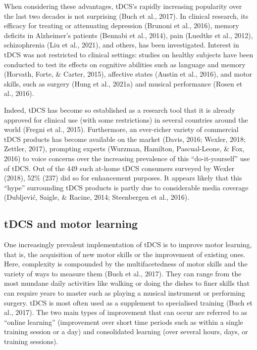 \documentclass[
  man,floatsintext]{apa6}
\begin{document}
When considering these advantages, tDCS's rapidly increasing popularity over the last two decades is not surprising (Buch et al., 2017). In clinical research, its efficacy for treating or attenuating depression (Brunoni et al., 2016), memory deficits in Alzheimer's patients (Bennabi et al., 2014), pain (Luedtke et al., 2012), schizophrenia (Liu et al., 2021), and others, has been investigated. Interest in tDCS was not restricted to clinical settings: studies on healthy subjects have been conducted to test its effects on cognitive abilities such as language and memory (Horvath, Forte, \& Carter, 2015), affective states (Austin et al., 2016), and motor skills, such as surgery (Hung et al., 2021a) and musical performance (Rosen et al., 2016).

Indeed, tDCS has become so established as a research tool that it is already approved for clinical use (with some restrictions) in several countries around the world (Fregni et al., 2015). Furthermore, an ever-richer variety of commercial tDCS products has become available on the market (Davis, 2016; Wexler, 2018; Zettler, 2017), prompting experts (Wurzman, Hamilton, Pascual-Leone, \& Fox, 2016) to voice concerns over the increasing prevalence of this ``do-it-yourself'' use of tDCS. Out of the 449 such at-home tDCS consumers surveyed by Wexler (2018), 52\% (237) did so for enhancement purposes. It appears likely that this ``hype'' surrounding tDCS products is partly due to considerable media coverage (Dubljević, Saigle, \& Racine, 2014; Steenbergen et al., 2016).

\hypertarget{tdcs-and-motor-learning}{%
\subsection{tDCS and motor learning}\label{tdcs-and-motor-learning}}

One increasingly prevalent implementation of tDCS is to improve motor learning, that is, the acquisition of new motor skills or the improvement of existing ones. Here, complexity is compounded by the multifacetedness of motor skills and the variety of ways to measure them (Buch et al., 2017). They can range from the most mundane daily activities like walking or doing the dishes to finer skills that can require years to master such as playing a musical instrument or performing surgery. tDCS is most often used as a supplement to specialised training (Buch et al., 2017). The two main types of improvement that can occur are referred to as ``online learning'' (improvement over short time periods such as within a single training session or a day) and consolidated learning (over several hours, days, or training sessions).
\end{document}
